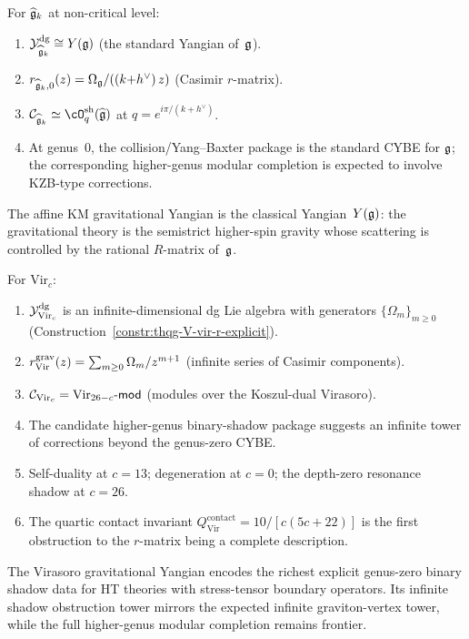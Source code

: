 \begin{computation}
\label{comp:thqg-V-affine-yangian}
For $\widehat{\mathfrak{g}}_k$ at non-critical level:
\begin{enumerate}[label=\textup{(\roman*)}]
\item $\mathcal{Y}^{\mathrm{dg}}_{\widehat{\mathfrak{g}}_k} \cong Y(\mathfrak{g})$
 (the standard Yangian of~$\mathfrak{g}$).
\item $r_{\widehat{\mathfrak{g}}_k,0}(z) = \Omega_{\mathfrak{g}}/((k{+}h^\vee)\,z)$
 (Casimir $r$-matrix).
\item $\cC_{\widehat{\fg}_k} \simeq
 \cO^{\mathrm{sh}}_q(\widehat{\fg})$
 at $q = e^{i\pi/(k+h^\vee)}$.
\item At genus~$0$, the collision/Yang--Baxter package is the
 standard CYBE for $\mathfrak{g}$; the corresponding higher-genus modular
 completion is expected to involve KZB-type corrections.
\end{enumerate}
The affine KM gravitational Yangian is the classical Yangian~$Y(\mathfrak{g})$:
the gravitational theory is the semistrict higher-spin gravity whose
scattering is controlled by the rational $R$-matrix of~$\mathfrak{g}$.
\end{computation}

\begin{computation}
\label{comp:thqg-V-vir-yangian-summary}
For $\mathrm{Vir}_c$:
\begin{enumerate}[label=\textup{(\roman*)}]
\item $\mathcal{Y}^{\mathrm{dg}}_{\mathrm{Vir}_c}$ is an infinite-dimensional
 dg Lie algebra with generators $\{\Omega_m\}_{m \geq 0}$
 (Construction~\ref{constr:thqg-V-vir-r-explicit}).
\item $r^{\mathrm{grav}}_{\mathrm{Vir}}(z) =
 \sum_{m \geq 0} \Omega_m/z^{m+1}$ (infinite series of
 Casimir components).
\item $\mathcal{C}_{\mathrm{Vir}_c} =
 \mathrm{Vir}_{26-c}\text{-}\mathsf{mod}$
 (modules over the Koszul-dual Virasoro).
\item The candidate higher-genus binary-shadow package suggests an
 infinite tower of corrections beyond the genus-zero CYBE.
\item Self-duality at $c = 13$; degeneration at $c = 0$;
 the depth-zero resonance shadow at $c = 26$.
\item The quartic contact invariant
 $Q^{\mathrm{contact}}_{\mathrm{Vir}} = 10/[c(5c+22)]$
 is the first obstruction to the $r$-matrix being a
 complete description.
\end{enumerate}
The Virasoro gravitational Yangian encodes the richest explicit
genus-zero binary shadow data for HT theories with stress-tensor
boundary operators. Its infinite shadow obstruction tower mirrors the expected
infinite graviton-vertex tower, while the full higher-genus modular
completion remains frontier.
\end{computation}


